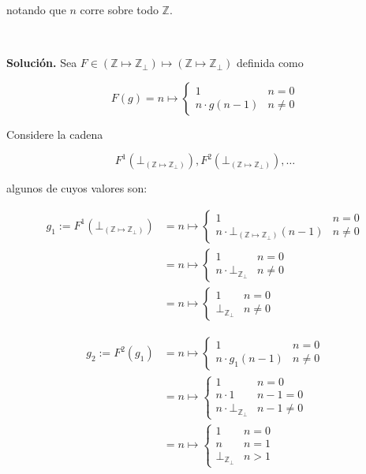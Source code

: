 \documentclass[article, 12pt]{article}
\begin{document}
notando que $n$ corre sobre todo $\mathbb{Z}$.

~

\textbf{Solución.} Sea $F \in \left( \mathbb{Z} \mapsto \mathbb{Z}_\bot  \right)
\mapsto (\mathbb{Z} \mapsto \mathbb{Z}_\bot )$ definida como

\begin{equation*}
  F(g) = n \mapsto \begin{cases}
    1 & n = 0 \\ 
    n \cdot g(n - 1) & n \neq 0
  \end{cases}
\end{equation*}

Considere la cadena 

$$F^1(\bot_{\left( \mathbb{Z} \mapsto \mathbb{Z}_\bot  \right)}), F^2\left(
\bot_{\left( \mathbb{Z} \mapsto \mathbb{Z}_\bot  \right)} \right), \ldots $$

algunos de cuyos valores son: 

\begin{align*}
  g_1 := F^1\left( \bot_{\left( \mathbb{Z} \mapsto \mathbb{Z}_\bot  \right)} \right)  
  &=
  n \mapsto \begin{cases}
    1 & n = 0 \\ 
    n \cdot \bot_{\left( \mathbb{Z} \mapsto \mathbb{Z}_\bot  \right)}(n-1) & n
    \neq 0
  \end{cases} \\ 
  &= n\mapsto \begin{cases}
    1 & n = 0 \\ 
    n \cdot \bot_{\mathbb{Z}_\bot } & n \neq 0
  \end{cases} \\
  &= n\mapsto \begin{cases}
    1 & n = 0 \\ 
    \bot_{\mathbb{Z}_\bot } & n \neq 0
  \end{cases} 
\end{align*}

\begin{align*}
  g_2 := F^2\left( g_1 \right)  
  &=
  n \mapsto \begin{cases}
    1 & n = 0 \\ 
    n \cdot g_1(n - 1) & n \neq 0
  \end{cases} \\ 
  &= n\mapsto \begin{cases}
    1 & n = 0 \\ 
    n \cdot 1 & n - 1 = 0 \\ 
    n \cdot \bot_{\mathbb{Z}_\bot } & n - 1 \neq 0
  \end{cases} \\
  &= n\mapsto \begin{cases}
    1 & n = 0 \\ 
    n & n = 1 \\ 
    \bot_{\mathbb{Z}_\bot } & n > 1
  \end{cases} 
\end{align*}
\end{document}
